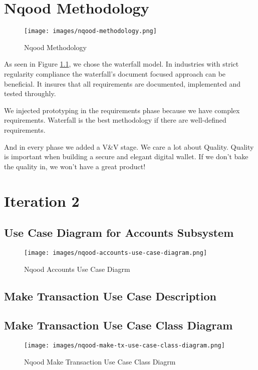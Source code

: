\documentclass[a4paper]{report}
\begin{document}
\chapter{Nqood Methodology}

\begin{figure}[h!]
    \centering
    \texttt{[image: images/nqood-methodology.png]}
    \caption{Nqood Methodology}
    \label{fig:nqood-methodology}
\end{figure}

As seen in Figure \ref{fig:nqood-methodology}, we chose the waterfall model. In industries with strict regularity compliance the waterfall's
document focused approach can be beneficial. It insures that all requirements are documented, implemented and tested
throughly.

We injected prototyping in the requirements phase because we have complex requirements. Waterfall is the best methodology if there are well-defined requirements.

And in every phase we added a V\&V stage. We care a lot about Quality. Quality is important when building a secure and elegant digital wallet. If we don't bake the quality in, we won't have a great product!

\chapter{Iteration 2}

\section{Use Case Diagram for Accounts Subsystem}

\begin{figure}[h!]
    \centering
    \texttt{[image: images/nqood-accounts-use-case-diagram.png]}
    \caption{Nqood Accounts Use Case Diagrm}
    \label{fig:nqood-accounts-use-case-diagram}
\end{figure}

\section{Make Transaction Use Case Description}



\section{Make Transaction Use Case Class Diagram}

\begin{figure}[h!]
    \centering
    \texttt{[image: images/nqood-make-tx-use-case-class-diagram.png]}
    \caption{Nqood Make Transaction Use Case Class Diagrm}
    \label{fig:nqood-make-transaction-use-case-class-diagram}
\end{figure}
\end{document}
